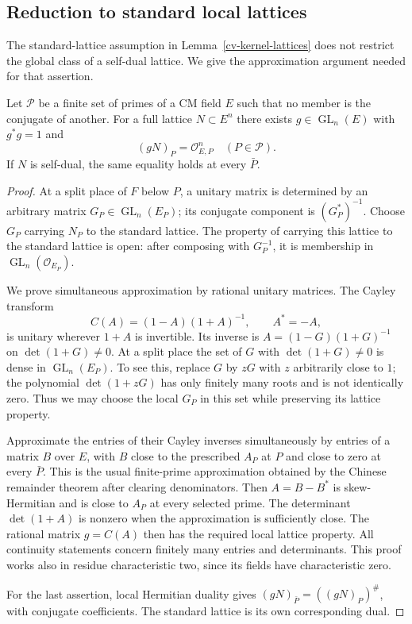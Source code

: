 \subsection{Reduction to standard local lattices}

The standard-lattice assumption in Lemma~\ref{cv-kernel-lattices}
does not restrict the global class of a self-dual lattice.
We give the approximation argument needed for that assertion.

\begin{lemma}\label{cv-unitary-approximation}
Let $\mathcal P$ be a finite set of primes of a CM field $E$ such
that no member is the conjugate of another.  For a full lattice
$N\subset E^n$ there exists $g\in\operatorname{GL}_n(E)$ with
$g^*g=1$ and
\[
                     (gN)_P=\mathcal O_{E,P}^{n}
                          \quad(P\in\mathcal P).
 \tag{CV12}
\]
If $N$ is self-dual, the same equality holds at every $\bar P$.
\end{lemma}
\begin{proof}
At a split place of $F$ below $P$, a unitary matrix is determined by
an arbitrary matrix $G_P\in\operatorname{GL}_n(E_P)$; its conjugate
component is $(G_P^*)^{-1}$.  Choose $G_P$ carrying $N_P$ to the
standard lattice.  The property of carrying this lattice to the
standard lattice is open: after composing with $G_P^{-1}$, it is
membership in $\operatorname{GL}_n(\mathcal O_{E_P})$.

We prove simultaneous approximation by rational unitary matrices.
The Cayley transform
\[
              C(A)=(1-A)(1+A)^{-1},\qquad A^*=-A,
 \tag{CV13}
\]
is unitary wherever $1+A$ is invertible.  Its inverse is
$A=(1-G)(1+G)^{-1}$ on $\det(1+G)\ne0$.
At a split place the set of $G$ with $\det(1+G)\ne0$ is dense in
$\operatorname{GL}_n(E_P)$.  To see this, replace $G$ by $zG$ with
$z$ arbitrarily close to $1$; the polynomial $\det(1+zG)$ has only
finitely many roots and is not identically zero.  Thus we may choose
the local $G_P$ in this set while preserving its lattice property.

Approximate the entries of their Cayley inverses simultaneously by
entries of a matrix $B$ over $E$, with $B$ close to the prescribed
$A_P$ at $P$ and close to zero at every $\bar P$.  This is the usual
finite-prime approximation obtained by the Chinese remainder
theorem after clearing denominators.  Then $A=B-B^*$ is
skew-Hermitian and is close to $A_P$ at every selected prime.
The determinant $\det(1+A)$ is nonzero when the approximation is
sufficiently close.  The rational matrix $g=C(A)$ then has the
required local lattice property.  All continuity statements concern
finitely many entries and determinants.  This proof works also in
residue characteristic two, since its fields have characteristic zero.

For the last assertion, local Hermitian duality gives
$(gN)_{\bar P}=((gN)_P)^\#$, with conjugate coefficients.
The standard lattice is its own corresponding dual.
\end{proof}

